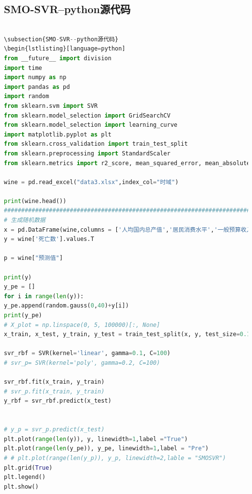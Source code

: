 \documentclass{whutmod}
\begin{document}
\subsection{SMO-SVR--python源代码}
\begin{lstlisting}[language=python]

\subsection{SMO-SVR--python源代码}
\begin{lstlisting}[language=python]
from __future__ import division
import time
import numpy as np
import pandas as pd
import random
from sklearn.svm import SVR
from sklearn.model_selection import GridSearchCV
from sklearn.model_selection import learning_curve
import matplotlib.pyplot as plt
from sklearn.cross_validation import train_test_split
from sklearn.preprocessing import StandardScaler
from sklearn.metrics import r2_score, mean_squared_error, mean_absolute_error

wine = pd.read_excel("data3.xlsx",index_col="时域")

print(wine.head())
#############################################################################
# 生成随机数据
x = pd.DataFrame(wine,columns = ['人均国内总产值','居民消费水平','一般预算收入'])
y = wine['死亡数'].values.T

p = wine["预测值"]

print(y)
y_pe = []
for i in range(len(y)):
y_pe.append(random.gauss(0,40)+y[i])
print(y_pe)
# X_plot = np.linspace(0, 5, 100000)[:, None]
x_train, x_test, y_train, y_test = train_test_split(x, y, test_size=0.15, random_state=33)

svr_rbf = SVR(kernel='linear', gamma=0.1, C=100)
# svr_p= SVR(kernel='poly', gamma=0.2, C=100)

svr_rbf.fit(x_train, y_train)
# svr_p.fit(x_train, y_train)
y_rbf = svr_rbf.predict(x_test)


# y_p = svr_p.predict(x_test)
plt.plot(range(len(y)), y, linewidth=1,label ="True")
plt.plot(range(len(y_pe)), y_pe, linewidth=1,label = "Pre")
# # plt.plot(range(len(y_p)), y_p, linewidth=2,lable = "SMOSVR")
plt.grid(True)
plt.legend()
plt.show()

\end{lstlisting}
\end{document}
